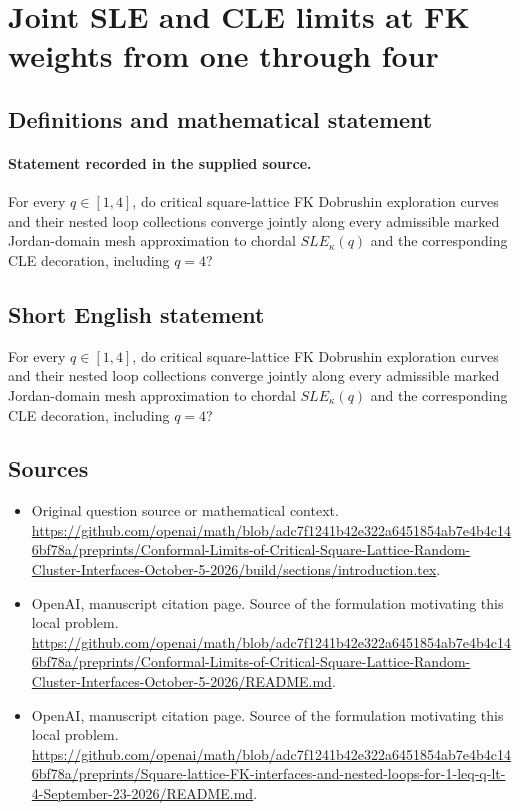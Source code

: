 \documentclass[11pt]{article}
\begin{document}
\section*{Joint SLE and CLE limits at FK weights from one through four}\label{statement}
\subsection{Definitions and mathematical statement}
\paragraph{Statement recorded in the supplied source.}
For every $q\in [1,4]$, do critical square-lattice FK Dobrushin exploration curves and their nested loop collections converge jointly along every admissible marked Jordan-domain mesh approximation to chordal $SLE_\kappa (q)$ and the corresponding CLE decoration, including $q=4$?
\subsection{Short English statement}
For every $q\in [1,4]$, do critical square-lattice FK Dobrushin exploration curves and their nested loop collections converge jointly along every admissible marked Jordan-domain mesh approximation to chordal $SLE_\kappa (q)$ and the corresponding CLE decoration, including $q=4$?
\subsection{Sources}
\begin{itemize}
\item[S1] Original question source or mathematical context.
\url{https://github.com/openai/math/blob/adc7f1241b42e322a6451854ab7e4b4c146bf78a/preprints/Conformal-Limits-of-Critical-Square-Lattice-Random-Cluster-Interfaces-October-5-2026/build/sections/introduction.tex}.
\item[S2] OpenAI, manuscript citation page. Source of the formulation motivating this local problem.
\url{https://github.com/openai/math/blob/adc7f1241b42e322a6451854ab7e4b4c146bf78a/preprints/Conformal-Limits-of-Critical-Square-Lattice-Random-Cluster-Interfaces-October-5-2026/README.md}.
\item[S3] OpenAI, manuscript citation page. Source of the formulation motivating this local problem.
\url{https://github.com/openai/math/blob/adc7f1241b42e322a6451854ab7e4b4c146bf78a/preprints/Square-lattice-FK-interfaces-and-nested-loops-for-1-leq-q-lt-4-September-23-2026/README.md}.
\end{itemize}
\end{document}

